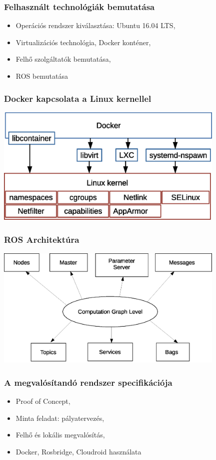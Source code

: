 \documentclass{beamer}
\begin{document}
\begin{frame} 
\frametitle{Felhasznált technológiák bemutatása}
\begin{itemize}
	\item Operációs rendszer kiválasztása: Ubuntu 16.04 LTS,
	\item Virtualizációs technológia, Docker konténer,
	\item Felhő szolgáltatók bemutatása,
	\item ROS bemutatása
\end{itemize}
\end{frame}

\begin{frame} 
\frametitle{Docker kapcsolata a Linux kernellel}
	\includegraphics[width=11cm]{../docker-architektura}
\end{frame}

\begin{frame} 
\frametitle{ROS Architektúra}
	\includegraphics[width=11cm]{../ROS}
\end{frame}

\begin{frame} 
\frametitle{A megvalósítandó rendszer specifikációja}
\begin{itemize}
	\item Proof of Concept,
	\item Minta feladat: pályatervezés,
	\item Felhő és lokális megvalósítás,
	\item Docker, Rosbridge, Cloudroid használata
\end{itemize}
\end{frame}
\end{document}
